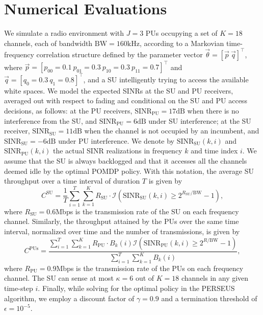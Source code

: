 \documentclass[10pt,twocolumn]{IEEEtran}
\begin{document}
\section{Numerical Evaluations}\label{IV}
We simulate a radio environment with $J{=}3$ PUs occupying a set of $K{=}18$ channels, each of bandwidth $\text{BW}{=}160 \text{kHz}$, according to a Markovian time-frequency correlation structure defined by the parameter vector $\vec{\theta}{=}[\vec{p}\ \vec{q}]^\intercal$, where $\vec{p}{=}[p_{00}{=}0.1\ p_{01}{=}0.3\ p_{10}{=}0.3\ p_{11}{=}0.7]^\intercal$ and $\vec{q}{=}[q_{0}{=}0.3\ q_{1}{=}0.8]^\intercal$, and a SU intelligently trying to access the available white spaces. We model the expected SINRs at the SU and PU receivers, averaged out with respect to fading and conditional on the SU and PU access decisions, as follows: 
at the PU receivers,
$\text{SINR}_{\text{PU}}{=}17\text{dB}$ when there is no interference from the SU, and $\text{SINR}_{\text{PU}}{=}6\text{dB}$ under SU interference; 
at the SU receiver,
 $\text{SINR}_{\text{SU}}{=}11\text{dB}$ when the channel is not occupied by an incumbent, and $\text{SINR}_{\text{SU}}{=}{-}6\text{dB}$ under PU interference.
  We denote by $\text{SINR}_{\text{SU}}(k,i)$ 
 and $\text{SINR}_{\text{PU}}(k,i)$ 
 the actual SINR realizations in 
 frequency $k$ and time index $i$.
  We assume that the SU is always backlogged and that it accesses all the channels deemed idle by the optimal POMDP policy. 
 With this notation, the average SU throughput
 over a time interval of duration $T$ is given by $$C^{\text{SU}} = \frac{1}{T}\sum_{i=1}^T \sum_{k=1}^{K} R_{\text{SU}} \cdot \mathcal{I}\left(\text{SINR}_{\text{SU}}(k,i) \geq 2^{R_{\text{SU}}/\text{BW}} - 1\right),$$ where $R_{\text{SU}}{=}0.6$Mbps is the transmission rate
   of the SU on each frequency channel. Similarly, the throughput attained by the PUs
  over the same time interval,
  normalized over time and the number of transmissions,
   is given by $$C^{\text{PUs}} = \frac{\sum_{i=1}^{T}\sum_{k=1}^{K}R_{\text{PU}} \cdot B_{k}(i)\mathcal{I}\left(\text{SINR}_{\text{PU}}(k,i) \geq 2^{R/\text{BW}} - 1\right)}{\sum_{i=1}^{T}\sum_{k=1}^{K}B_{k}(i)},$$ where $R_{\text{PU}}{=}0.9$Mbps is the transmission rate of the PUs on each frequency channel. The SU can sense at most $\kappa{=}6$ out of $K{=}18$ channels in any given time-step $i$. Finally, while solving for the optimal policy in the PERSEUS algorithm, we employ a discount factor of $\gamma{=}0.9$ and a termination threshold of $\epsilon{=}10^{-5}$.
\end{document}
